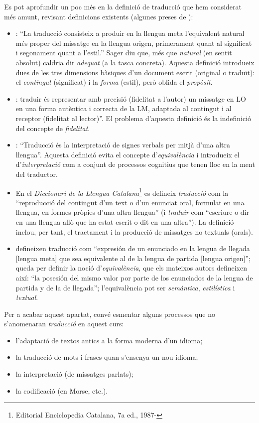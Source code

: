 Es pot aprofundir un poc més en la definició de
traducció que hem considerat més amunt, revisant definicions
existents (algunes preses de \citealt{sager93b}):
\begin{itemize}
\item \citet[p.~19]{nida59b}: ``La traducció consisteix a produir en la llengua meta
l'equivalent natural més proper del missatge en la llengua origen,
primerament quant al significat i segonament quant a l'estil.'' Sager diu
que, més que \emph{natural} (en sentit absolut) caldria dir \emph{adequat}
(a la tasca concreta). Aquesta definició introdueix dues de les tres
dimensions bàsiques d'un document escrit (original o traduït):
el \emph{contingut} (significat) i la \emph{forma} (estil), però oblida el 
\emph{propòsit}. 
\item \citet{flamand83b}: traduir és representar amb precisió
(fidelitat a l'autor) un missatge
en LO 
en una forma autèntica i correcta de la LM,
adaptada al contingut i al receptor (fidelitat al lector)''. El problema
d'aquesta definició
és la indefinició del concepte de \emph{fidelitat}.
\item \citet{jakobson66b}: ``Traducció és la interpretació de signes
verbals per mitjà d'una altra llengua''. Aquesta definició evita el
concepte d'\emph{equi\-va\-lèn\-cia} i introdueix el d'\emph{interpretació}
com a conjunt de processos cognitius que tenen lloc en la ment del
traductor.
\item En el \emph{Diccionari de la Llengua
    Catalana}\footnote{Editorial Enciclopedia Catalana, 7a ed.,
    1987-}  
es defineix {\em
    traducció} com la
``reproducció del contingut
d'un text o d'un enunciat oral, formulat en una llengua, en formes
pròpies d'una altra llengua'' (i \emph{traduir} com  ``escriure o dir en una
llengua allò que ha estat escrit o dit en una altra''). La 
definició
inclou, per tant, el tractament i la producció de missatges
no textuals (orals).
\item \citet{alcaraz97b} defineixen
  traducció com ``expresión de un
enunciado en la lengua de llegada [lengua meta] que sea equivalente al de la
lengua de partida [lengua origen]''; queda per definir la noció
d'\emph{equivalència}, que els mateixos autors defineixen així: ``la
posesión del mismo valor por parte de los enunciados de la lengua de
partida y de la de llegada''; l'equivalència pot ser {\em
semàntica}, \emph{estilística} i \emph{textual}. 
\end{itemize}

Per a acabar aquest apartat, convé esmentar alguns processos que no
s'anomenaran \emph{traducció} en aquest curs:
\begin{itemize}
\item l'adaptació de textos antics a la forma moderna d'un idioma;
\item la traducció de mots i frases quan s'ensenya un nou idioma;
\item la interpretació (de missatges parlats);
\item la codificació (en Morse, etc.).
\end{itemize}


